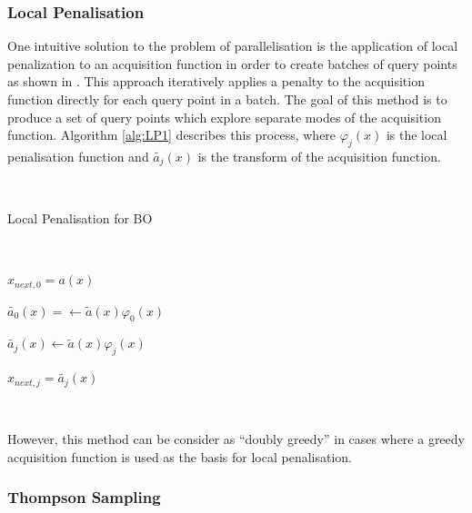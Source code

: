 		\subsubsection{Local Penalisation}

			One intuitive solution to the problem of parallelisation is the application of local penalization to an acquisition function in order to create batches of query points as shown in \cite{37}. This approach iteratively applies a penalty to the acquisition function directly for each query point in a batch. The goal of this method is to produce a set of query points which explore separate modes of the acquisition function. Algorithm \ref{alg:LP1} describes this process, where \(\varphi_j(x)\) is the local penalisation function and \(\widetilde{a_j}(x)\) is the transform of the acquisition function.
			
			\par \(~\)

			\begin{algorithm}[H]\label{alg:LP1}
			\caption{Local Penalisation for BO}
			\SetAlgoLined
			\
			\

		  	\(x_{next,0} = a(x)\)\;

		  	\(\widetilde{a_0}(x) = \leftarrow \widetilde{a}(x)\varphi_{0}(x)\)\;


			{
				\(\widetilde{a_j}(x) \leftarrow \widetilde{a}(x)\varphi_{j}(x)\)\;

			  	\(x_{next,j} = \widetilde{a_j}(x)\)\;

			}

			
			\end{algorithm}

			\par \(~\)

			However, this method can be consider as “doubly greedy” \cite{36} in cases where a greedy acquisition function is used as the basis for local penalisation.




		\subsubsection{Thompson Sampling}

